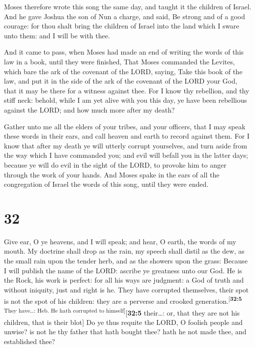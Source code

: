  Moses therefore wrote this song the same day, and taught
it the children of Israel.  And he gave Joshua the son of
Nun a charge, and said, Be strong and of a good courage: for thou shalt
bring the children of Israel into the land which I sware unto them: and
I will be with thee.

 And it came to pass, when Moses had made an end of
writing the words of this law in a book, until they were finished,
 That Moses commanded the Levites, which bare the ark of
the covenant of the LORD, saying,  Take this book of the
law, and put it in the side of the ark of the covenant of the LORD your
God, that it may be there for a witness against thee. 
For I know thy rebellion, and thy stiff neck: behold, while I am yet
alive with you this day, ye have been rebellious against the LORD; and
how much more after my death?

 Gather unto me all the elders of your tribes, and your
officers, that I may speak these words in their ears, and call heaven
and earth to record against them.  For I know that after
my death ye will utterly corrupt yourselves, and turn aside from the way
which I have commanded you; and evil will befall you in the latter days;
because ye will do evil in the sight of the LORD, to provoke him to
anger through the work of your hands.  And Moses spake in
the ears of all the congregation of Israel the words of this song, until
they were ended.

\hypertarget{section-31}{%
\section{32}\label{section-31}}

 Give ear, O ye heavens, and I will speak; and hear, O
earth, the words of my mouth.  My doctrine shall drop as
the rain, my speech shall distil as the dew, as the small rain upon the
tender herb, and as the showers upon the grass:  Because I
will publish the name of the LORD: ascribe ye greatness unto our God.
 He is the Rock, his work is perfect: for all his ways are
judgment: a God of truth and without iniquity, just and right is he.
 They have corrupted themselves, their spot is not the
spot of his children: they are a perverse and crooked
generation.\textsuperscript{{[}\textbf{32:5} They have\ldots: Heb. He
hath corrupted to himself{]}}{[}\textbf{32:5} their\ldots: or, that they
are not his children, that is their blot{]}  Do ye thus
requite the LORD, O foolish people and unwise? is not he thy father that
hath bought thee? hath he not made thee, and established thee?

